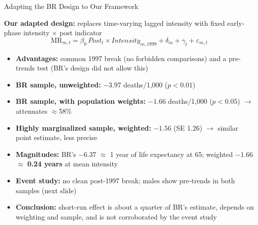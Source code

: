 \documentclass[aspectratio=169,usenames,dvipsnames]{beamer}
\begin{document}
\begin{frame}{Adapting the BR Design to Our Framework}\label{br_adapt}
\footnotesize

\textbf{Our adapted design:} replaces time-varying lagged intensity with fixed early-phase intensity $\times$ post indicator
\begin{equation*}
\text{MR}_{m,t} = \beta_0\,\textit{Post}_t \times \textit{Intensity}_{m,1999} + \delta_m + \gamma_t + \varepsilon_{m,t}
\end{equation*}

\vspace{-2pt}
\begin{itemize}
  \item[$\circ$] \textbf{Advantages:} common 1997 break (no forbidden comparisons) and a pre-trends test (BR's design did not allow this)
  \item[$\circ$] \textbf{BR sample, unweighted:} $-3.97$ deaths/1,000 ($p<0.01$)
  \item[$\circ$] \textbf{BR sample, with population weights:} $-1.66$ deaths/1,000 ($p<0.05$) $\to$ attenuates $\approx$58\%
  \item[$\circ$] \textbf{Highly marginalized sample, weighted:} $-1.56$ (SE 1.26) $\to$ similar point estimate, less precise
  \vspace{1pt}
  \item[$\circ$] \textbf{Magnitudes:} BR's $-6.37$ $\approx$ 1 year of life expectancy at 65; weighted $-1.66$ $\approx$ \textbf{0.24 years} at mean intensity
  \vspace{1pt}
  \item[$\circ$] \textbf{Event study:} no clean post-1997 break; males show pre-trends in both samples (next slide)
  \vspace{1pt}
  \item[$\circ$] \textbf{Conclusion:} short-run effect is about a quarter of BR's estimate, depends on weighting and sample, and is not corroborated by the event study
\end{itemize}

\end{frame}

\end{document}
